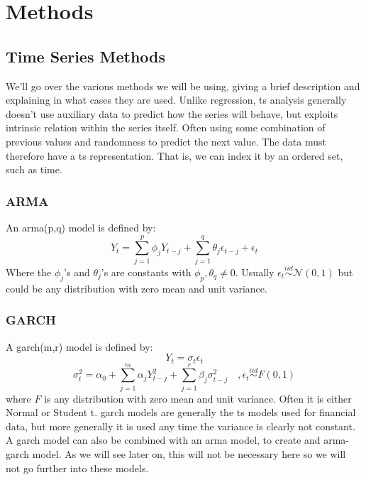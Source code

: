 \chapter{Methods}

\section{Time Series Methods}
We'll go over the various methods we will be using, giving a brief description and explaining in what cases they are used.
Unlike regression, \acrlong{ts} analysis generally doesn't use auxiliary data to predict how the series will behave, but exploits intrinsic relation within the series itself. Often using some combination of previous values and randomness to predict the next value.
The data must therefore have a \acrlong{ts} representation. That is, we can index it by an ordered set, such as time.


\subsection{ARMA}
An \acrfull{arma}(p,q) model is defined by:
$$
Y_t = \sum_{j=1}^p \phi_j Y_{t-j} + \sum_{j=1}^q \theta_j \epsilon_{t-j} + \epsilon_t
$$
Where the $\phi_j$'s and $\theta_j$'s are constants with $\phi_p , \theta_q \neq 0$. Usually $\epsilon_t \stackrel{iid}{\sim} \mathcal{N}(0,1)$ but could be any distribution with zero mean and unit variance.
\subsection{GARCH}
A \acrfull{garch}(m,r) model is defined by:
$$
Y_t = \sigma_t \epsilon_t
$$
$$
\sigma_t^2 = \alpha_0 + \sum_{j=1}^m \alpha_j Y_{t-j}^2 + \sum_{j=1}^r \beta_j \sigma_{t-j}^2
\quad, \epsilon_t \stackrel{iid}{\sim} F(0,1)
$$
where $F$ is any distribution with zero mean and unit variance. Often it is either Normal or Student t.
\acrshort{garch} models are generally the \acrlong{ts} models used for financial data, but more generally it is used any time the variance is clearly not constant. A \acrshort{garch} model can also be combined with an \acrshort{arma} model, to create and \acrshort{arma}-\acrshort{garch} model. As we will see later on, this will not be necessary here so we will not go further into these models.

